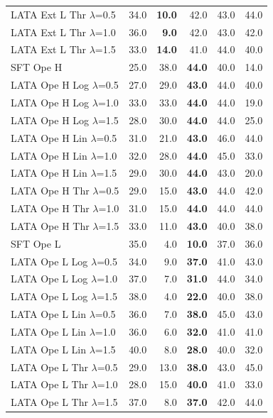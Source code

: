 \begin{longtable}{lrrrrr}
LATA Ext L Thr $\lambda$=0.5 & 34.0 & \textbf{10.0} & 42.0 & 43.0 & 44.0 \\
LATA Ext L Thr $\lambda$=1.0 & 36.0 & \textbf{9.0} & 42.0 & 43.0 & 42.0 \\
LATA Ext L Thr $\lambda$=1.5 & 33.0 & \textbf{14.0} & 41.0 & 44.0 & 40.0 \\
SFT Ope H & 25.0 & 38.0 & \textbf{44.0} & 40.0 & 14.0 \\
LATA Ope H Log $\lambda$=0.5 & 27.0 & 29.0 & \textbf{43.0} & 44.0 & 40.0 \\
LATA Ope H Log $\lambda$=1.0 & 33.0 & 33.0 & \textbf{44.0} & 44.0 & 19.0 \\
LATA Ope H Log $\lambda$=1.5 & 28.0 & 30.0 & \textbf{44.0} & 44.0 & 25.0 \\
LATA Ope H Lin $\lambda$=0.5 & 31.0 & 21.0 & \textbf{43.0} & 46.0 & 44.0 \\
LATA Ope H Lin $\lambda$=1.0 & 32.0 & 28.0 & \textbf{44.0} & 45.0 & 33.0 \\
LATA Ope H Lin $\lambda$=1.5 & 29.0 & 30.0 & \textbf{44.0} & 43.0 & 20.0 \\
LATA Ope H Thr $\lambda$=0.5 & 29.0 & 15.0 & \textbf{43.0} & 44.0 & 42.0 \\
LATA Ope H Thr $\lambda$=1.0 & 31.0 & 15.0 & \textbf{44.0} & 44.0 & 44.0 \\
LATA Ope H Thr $\lambda$=1.5 & 33.0 & 11.0 & \textbf{43.0} & 40.0 & 38.0 \\
SFT Ope L & 35.0 & 4.0 & \textbf{10.0} & 37.0 & 36.0 \\
LATA Ope L Log $\lambda$=0.5 & 34.0 & 9.0 & \textbf{37.0} & 41.0 & 43.0 \\
LATA Ope L Log $\lambda$=1.0 & 37.0 & 7.0 & \textbf{31.0} & 44.0 & 34.0 \\
LATA Ope L Log $\lambda$=1.5 & 38.0 & 4.0 & \textbf{22.0} & 40.0 & 38.0 \\
LATA Ope L Lin $\lambda$=0.5 & 36.0 & 7.0 & \textbf{38.0} & 45.0 & 43.0 \\
LATA Ope L Lin $\lambda$=1.0 & 36.0 & 6.0 & \textbf{32.0} & 41.0 & 41.0 \\
LATA Ope L Lin $\lambda$=1.5 & 40.0 & 8.0 & \textbf{28.0} & 40.0 & 32.0 \\
LATA Ope L Thr $\lambda$=0.5 & 29.0 & 13.0 & \textbf{38.0} & 43.0 & 45.0 \\
LATA Ope L Thr $\lambda$=1.0 & 28.0 & 15.0 & \textbf{40.0} & 41.0 & 33.0 \\
LATA Ope L Thr $\lambda$=1.5 & 37.0 & 8.0 & \textbf{37.0} & 42.0 & 44.0 \\

\end{longtable}
